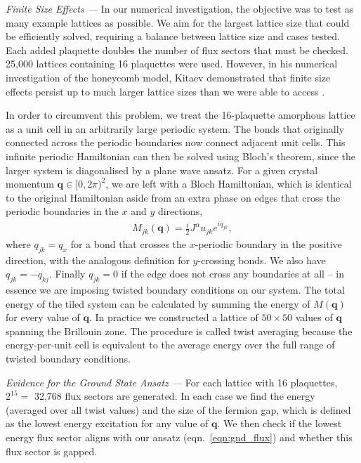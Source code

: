 \documentclass[%
 reprint,
superscriptaddress,
 amsmath,amssymb,
aps,
]{revtex4-2}
\renewcommand{\bf}[1]{\ensuremath{\textbf{#1}}}
\begin{document}
{\it Finite Size Effects ---}
In our numerical investigation, the objective was to test as many example lattices as possible. We aim for the largest lattice size that could be efficiently solved, requiring a balance between lattice size and cases tested. Each added plaquette doubles the number of flux sectors that must be checked. 25,000 lattices containing 16 plaquettes were used. However, in his numerical investigation of the honeycomb model, Kitaev demonstrated that finite size effects persist up to much larger lattice sizes than we were able to access \cite{kitaevAnyonsExactlySolved2006}. \par 
In order to circumvent this problem, we treat the 16-plaquette amorphous lattice as a unit cell in an arbitrarily large periodic system. The bonds that originally connected across the periodic boundaries now connect adjacent unit cells. This infinite periodic Hamiltonian can then be solved using Bloch's theorem, since the larger system is diagonalised by a plane wave ansatz. For a given crystal momentum $\bf q \in [0,2\pi)^2 $, we are left with a Bloch Hamiltonian, which is identical to the original Hamiltonian aside from an extra phase on edges that cross the periodic boundaries in the $x$ and $y$ directions,
\begin{align}
    M_{jk}(\bf q) =  \frac{i}{2} J^{\alpha} u_{jk} e^{i q_{jk}},
\end{align}
where $q_{jk} = q_x$ for a bond that crosses the $x$-periodic boundary in the positive direction, with the analogous definition for $y$-crossing bonds. We also have $q_{jk} = -q_{kj}$. Finally $q_{jk} = 0$ if the edge does not cross any boundaries at all -- in essence we are imposing twisted boundary conditions on our system. The total energy of the tiled system can be calculated by summing the energy of $M(\bf q)$ for every value of $\bf q$. In practice we constructed a lattice of $50 \times 50$ values of $\bf q$ spanning the Brillouin zone. The procedure is called twist averaging because the energy-per-unit cell is equivalent to the average energy over the full range of twisted boundary conditions. \par 
{\it Evidence for the Ground State Ansatz ---}
For each lattice with 16 plaquettes, $2^{15} =$ 32,768 flux sectors are generated. In each case we find the energy (averaged over all twist values) and the size of the fermion gap, which is defined as the lowest energy excitation for any value of $\bf q$. We then check if the lowest energy flux sector aligns with our ansatz (eqn.~\ref{eqn:gnd_flux}) and whether this flux sector is gapped. \par
\end{document}
